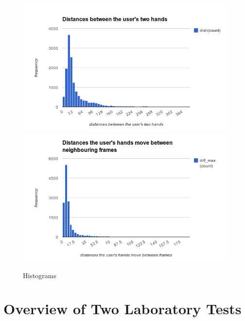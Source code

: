 %
\begin{figure}[H]
\centering
\includegraphics[width=0.9\linewidth]{fig/histogram1.png}
\includegraphics[width=0.9\linewidth]{fig/histogram2.png}
\caption{Histograms}
\label{fig:histogram}
\end{figure}

\section{Overview of Two Laboratory Tests}


